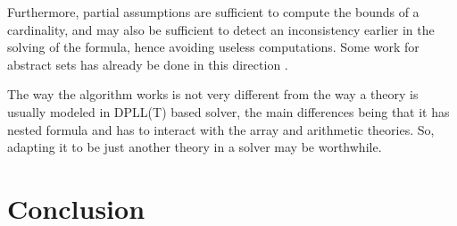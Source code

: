 \documentclass[]{article}
\begin{document}
Furthermore, partial assumptions are sufficient to compute the bounds of
a cardinality, and may also be sufficient to detect an inconsistency
earlier in the solving of the formula, hence avoiding useless
computations. Some work for abstract sets has already be done in this
direction \cite{cardinalityset}.

The way the algorithm works is not very different from the way a theory
is usually modeled in DPLL(T) based solver, the main differences being
that it has nested formula and has to interact with the array and
arithmetic theories. So, adapting it to be just another theory in a
solver may be worthwhile.

\newpage

\section*{Conclusion}





\end{document}
